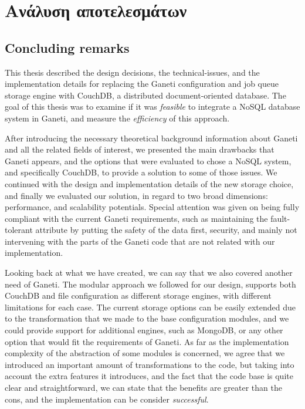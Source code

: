 \chapter{Ανάλυση αποτελεσμάτων}\label{ch:results}

\section{Concluding remarks}\label{sec:remarks}

This thesis described the design decisions, the technical-issues, and the
implementation details for replacing the Ganeti configuration and job queue
storage engine with CouchDB, a distributed document-oriented database. The goal
of this thesis was to examine if it was \emph{feasible} to integrate a NoSQL
database system in Ganeti, and measure the \emph{efficiency} of this approach.

After introducing the necessary theoretical background information about
Ganeti and all the related fields of interest, we presented the main drawbacks
that Ganeti appears, and the options that were evaluated to chose a NoSQL
system, and specifically CouchDB, to provide a solution to some of those issues.
We continued with the design and implementation details of the new storage
choice, and finally we evaluated our solution, in regard to two broad
dimensions: performance, and scalability potentials. Special attention was given
on being fully compliant with the current Ganeti requirements, such as
maintaining the fault-tolerant attribute by putting the safety of the data
first, security, and mainly not intervening with the parts of the Ganeti code
that are not related with our implementation.

Looking back at what we have created, we can say that we also covered another
need of Ganeti. The modular approach we followed for our design, supports both
CouchDB and file configuration as different storage engines, with different
limitations for each case. The current storage options can be easily extended
due to the transformation that we made to the base configuration modules, and we
could provide support for additional engines, such as MongoDB, or any other
option that would fit the requirements of Ganeti. As far as the implementation
complexity of the abstraction of some modules is concerned, we agree that we
introduced an important amount of transformations to the code, but taking into
account the extra features it introduces, and the fact that the code base is
quite clear and straightforward, we can state that the benefits are greater than
the cons, and the implementation can be consider \emph{successful}.

